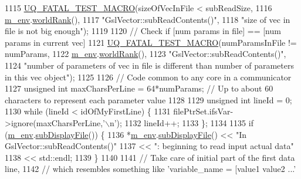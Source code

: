 \begin{DoxyCode}
1115     \hyperlink{_defines_8h_a56d63d18d0a6d45757de47fcc06f574d}{UQ\_FATAL\_TEST\_MACRO}(sizeOfVecInFile < subReadSize,
1116                         \hyperlink{class_q_u_e_s_o_1_1_vector_ae7615172bb1e54339151d3f3d71a0344}{m\_env}.\hyperlink{class_q_u_e_s_o_1_1_base_environment_a78b57112bbd0e6dd0e8afec00b40ffa7}{worldRank}(),
1117                         \textcolor{stringliteral}{"GslVector::subReadContents()"},
1118                         \textcolor{stringliteral}{"size of vec in file is not big enough"});
1119 
1120     \textcolor{comment}{// Check if [num params in file] == [num params in current vec]}
1121     \hyperlink{_defines_8h_a56d63d18d0a6d45757de47fcc06f574d}{UQ\_FATAL\_TEST\_MACRO}(numParamsInFile != numParams,
1122                         \hyperlink{class_q_u_e_s_o_1_1_vector_ae7615172bb1e54339151d3f3d71a0344}{m\_env}.\hyperlink{class_q_u_e_s_o_1_1_base_environment_a78b57112bbd0e6dd0e8afec00b40ffa7}{worldRank}(),
1123                         \textcolor{stringliteral}{"GslVector::subReadContents()"},
1124                         \textcolor{stringliteral}{"number of parameters of vec in file is different than number of parameters in this
       vec object"});
1125 
1126     \textcolor{comment}{// Code common to any core in a communicator}
1127     \textcolor{keywordtype}{unsigned} \textcolor{keywordtype}{int} maxCharsPerLine = 64*numParams; \textcolor{comment}{// Up to about 60 characters to represent each parameter
       value}
1128 
1129     \textcolor{keywordtype}{unsigned} \textcolor{keywordtype}{int} lineId = 0;
1130     \textcolor{keywordflow}{while} (lineId < idOfMyFirstLine) \{
1131       filePtrSet.ifsVar->ignore(maxCharsPerLine,\textcolor{charliteral}{'\(\backslash\)n'});
1132       lineId++;
1133     \};
1134 
1135     \textcolor{keywordflow}{if} (\hyperlink{class_q_u_e_s_o_1_1_vector_ae7615172bb1e54339151d3f3d71a0344}{m\_env}.\hyperlink{class_q_u_e_s_o_1_1_base_environment_a8a0064746ae8dddfece4229b9ad374d6}{subDisplayFile}()) \{
1136       *\hyperlink{class_q_u_e_s_o_1_1_vector_ae7615172bb1e54339151d3f3d71a0344}{m\_env}.\hyperlink{class_q_u_e_s_o_1_1_base_environment_a8a0064746ae8dddfece4229b9ad374d6}{subDisplayFile}() << \textcolor{stringliteral}{"In GslVector::subReadContents()"}
1137                               << \textcolor{stringliteral}{": beginning to read input actual data"}
1138                               << std::endl;
1139     \}
1140 
1141     \textcolor{comment}{// Take care of initial part of the first data line,}
1142     \textcolor{comment}{// which resembles something like 'variable\_name = [value1 value2 ...'}

\end{DoxyCode}
